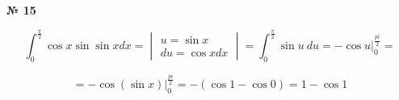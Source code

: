 \documentclass{article}
\begin{document}
\textbf{№ 15} 

\begingroup

\Large

$$ \int_{0}^{\frac{\pi}{2}} \cos{x} \sin{\sin{x}} dx 
= \begin{vmatrix} u = \sin{x} \\ 
                 du = \cos{x}dx \end{vmatrix}
= \int_{0}^{\frac{\pi}{2}} \sin{u} \ du
= -\cos{u} \bigg\vert_{0}^{\frac{pi}{2}}
= $$

$$ = -\cos{(\sin{x})} \bigg\vert_{0}^{\frac{pi}{2}}
= - (\cos{1} - \cos{0})
= 1 - \cos{1} $$

\endgroup
\end{document}
